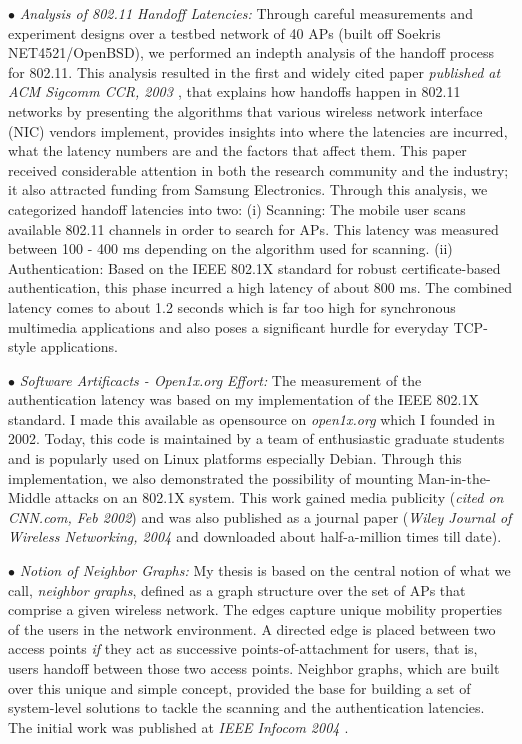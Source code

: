 \documentclass[11pt,letterpaper]{article}
\begin{document}
$\bullet$ {\it Analysis of 802.11 Handoff Latencies:} Through careful measurements and experiment designs over
a testbed network  of 40 APs (built off Soekris NET4521/OpenBSD), we performed an indepth analysis of the handoff
process for 802.11. This analysis resulted in the first and  widely cited paper {\it published at ACM Sigcomm CCR,
2003 \cite{ccr-handoff}}, that explains how handoffs happen in 802.11 networks by presenting the algorithms that various wireless network
interface (NIC) vendors implement, provides insights into where the latencies are incurred, what the latency numbers are
and the factors that affect them. This paper received considerable attention in both the research community and the
industry; it also attracted funding from Samsung Electronics.
Through this analysis, we categorized handoff latencies into two: (i) Scanning: The mobile user scans available 802.11
channels in order to search for APs. This latency was measured between 100 - 400 ms depending on the algorithm
used for scanning. (ii) Authentication: Based on the IEEE 802.1X standard for robust certificate-based authentication,
this phase incurred a high latency of about 800 ms. The combined latency comes to about 1.2 seconds which is far
too high for synchronous multimedia applications and also poses a significant hurdle for everyday TCP-style
applications. 

$\bullet$ {\it Software Artificacts - Open1x.org Effort:} The measurement of the authentication latency was based on my
implementation of the IEEE 802.1X standard.  I made this available as opensource on {\it open1x.org} which I founded in
2002. Today, this code is maintained by a team of enthusiastic  graduate students and is popularly used on Linux
platforms especially Debian. Through this implementation, we also demonstrated the possibility of mounting
Man-in-the-Middle attacks on an 802.1X system. This work gained media publicity ({\it cited on CNN.com, Feb 2002}) and
was also published as a journal paper ({\it Wiley Journal of Wireless Networking, 2004 \cite{security2004}} and downloaded about half-a-million times till date). 
  
$\bullet$ {\it Notion of Neighbor Graphs:} My thesis is based on the central notion of what we call, {\it
neighbor graphs}, defined as a graph structure over the set of APs that comprise a given wireless
network. The edges capture unique mobility properties of the users in the network environment. A directed edge is placed
between two access points {\it if} they act as successive points-of-attachment for users, that is, users handoff between
those two access points. Neighbor graphs, which are built over this unique and simple concept, provided the base for
building a set of system-level solutions to tackle the scanning and the authentication latencies. The initial work was
published at {\it IEEE Infocom 2004 \cite{mishra2004}}.
\end{document}
